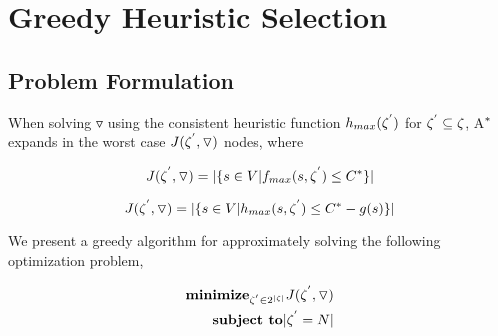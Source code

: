 
 
\chapter{Greedy Heuristic Selection}\label{ghs}


\section{Problem Formulation}
When solving $\triangledown$ using the consistent heuristic function $h_{max}(\zeta\sp{'})$ for $\zeta\sp{'} \subseteq \zeta$, A$\sp{*}$ expands in the worst case $J(\zeta\sp{'}, \triangledown)$ nodes, where

\begin{equation}
J(\zeta\sp{'},\triangledown) = |\{s \in V | f_{max}(s,\zeta\sp{'}) \leq C\sp{*}\}|
\label{eq:eq_size_search_tree_1}
\end{equation}

\begin{equation}
J(\zeta\sp{'},\triangledown) = |\{s \in V | h_{max}(s,\zeta\sp{'}) \leq C\sp{*} - g(s)\}|
\label{eq:eq_size_search_tree_2}
\end{equation}

We present a greedy algorithm for approximately solving the following optimization problem,

\begin{equation}
\begin{split}
\textbf{minimize}_{\zeta\sp{'} \in 2\sp{|\zeta|}}J(\zeta\sp{'}, \triangledown) \\
\textbf{subject to} |\zeta\sp{'} = N|
\end{split}
\end{equation}

